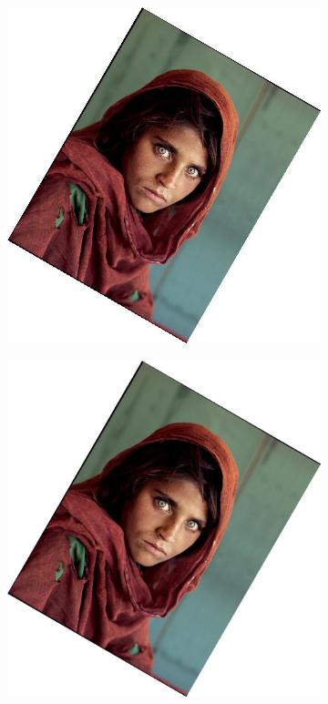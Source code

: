 \documentclass{article}
\begin{document}
\begin{figure}[H]
    \centering
    \begin{subfigure}{.3\textwidth}
        \centering
        \includegraphics[scale=0.04]{q1/output/similar_d:_6_s:_0.5.jpg}
    \end{subfigure}
    \begin{subfigure}{.3\textwidth}
        \centering
        \includegraphics[scale=0.04]{q1/output/similar_d:_6_s:_1.jpg}

\end{subfigure}
\end{figure}
\end{document}
